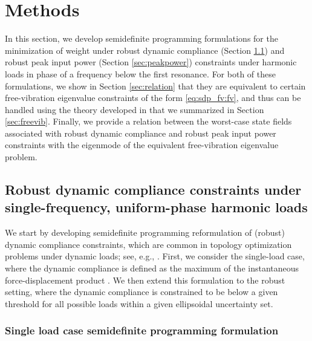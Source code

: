 \documentclass[preprint,3p]{elsarticle}
\numberwithin{equation}{section}
\begin{document}
\section{Methods}

In this section, we develop semidefinite programming formulations for the minimization of weight under robust dynamic compliance (Section \ref{sec:dyncompl}) and robust peak input power (Section \ref{sec:peakpower}) constraints under harmonic loads in phase of a frequency below the first resonance. For both of these formulations, we show in Section \ref{sec:relation} that they are equivalent to certain free-vibration eigenvalue constraints of the form \eqref{eq:sdp_fv:fv}, and thus can be handled using the theory developed in \citep{Tyburec2024global} that we summarized in Section \ref{sec:freevib}. Finally, we provide a relation between the worst-case state fields associated with robust dynamic compliance and robust peak input power constraints with the eigenmode of the equivalent free-vibration eigenvalue problem.

\subsection{Robust dynamic compliance constraints under single-frequency, uniform-phase harmonic loads}\label{sec:dyncompl}

We start by developing semidefinite programming reformulation of (robust) dynamic compliance constraints, which are common in topology optimization problems under dynamic loads; see, e.g., \citep{Olhoff2016}. First, we consider the single-load case, where the dynamic compliance is defined as the maximum of the instantaneous force-displacement product \citep{Olhoff2014}. We then extend this formulation to the robust setting, where the dynamic compliance is constrained to be below a given threshold for all possible loads within a given ellipsoidal uncertainty set.

\subsubsection{Single load case semidefinite programming formulation}
\end{document}
